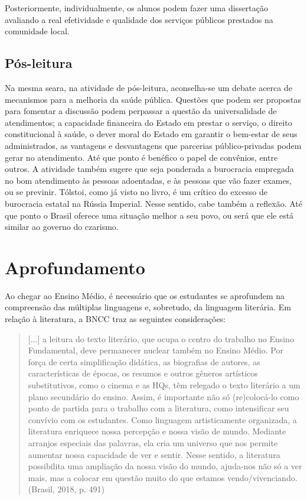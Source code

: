 \documentclass[12pt]{extarticle}
\begin{document}
Posteriormente, individualmente, os alunos podem fazer uma dissertação
avaliando a real efetividade e qualidade dos serviços públicos prestados
na comunidade local.

\subsection{Pós-leitura}

Na mesma seara, na atividade de pós-leitura, aconselha-se um
debate acerca de mecanismos para a melhoria da saúde pública. Questões
que podem ser propostas para fomentar a discussão podem perpassar a
questão da universalidade de atendimentos; a capacidade financeira do
Estado em prestar o serviço, o direito constitucional à saúde, o dever
moral do Estado em garantir o bem-estar de seus administrados, as
vantagens e desvantagens que parcerias público-privadas podem gerar no
atendimento. Até que ponto é benéfico o papel de convênios, entre
outros. A atividade também sugere que seja ponderada a burocracia
empregada no bom atendimento às pessoas adoentadas, e às pessoas que vão
fazer exames, ou se previnir. Tólstoi, como já visto no livro, é um
crítico do excesso de burocracia estatal na Rússia Imperial. Nesse
sentido, cabe também a reflexão. Até que ponto o Brasil oferece uma
situação melhor a seu povo, ou será que ele está similar ao governo do
czarismo.

\section{Aprofundamento}

Ao chegar ao Ensino Médio, é necessário que os estudantes se aprofundem
na compreensão das múltiplas linguagens e, sobretudo, da linguagem
literária. Em relação à literatura, a BNCC traz as seguintes
considerações:

\begin{quote}
{[}...{]} a leitura do texto literário, que ocupa o centro do trabalho
no Ensino Fundamental, deve permanecer nuclear também no Ensino Médio.
Por força de certa simplificação didática, as biografias de autores, as
características de épocas, os resumos e outros gêneros artísticos
substitutivos, como o cinema e as HQs, têm relegado o texto literário a
um plano secundário do ensino. Assim, é importante não só (re)colocá-lo
como ponto de partida para o trabalho com a literatura, como
intensificar seu convívio com os estudantes. Como linguagem
artisticamente organizada, a literatura enriquece nossa percepção e
nossa visão de mundo. Mediante arranjos especiais das palavras, ela cria
um universo que nos permite aumentar nossa capacidade de ver e sentir.
Nesse sentido, a literatura possibilita uma ampliação da nossa visão do
mundo, ajuda-nos não só a ver mais, mas a colocar em questão muito do
que estamos vendo/vivenciando. (Brasil, 2018, p. 491)
\end{quote}
\end{document}
